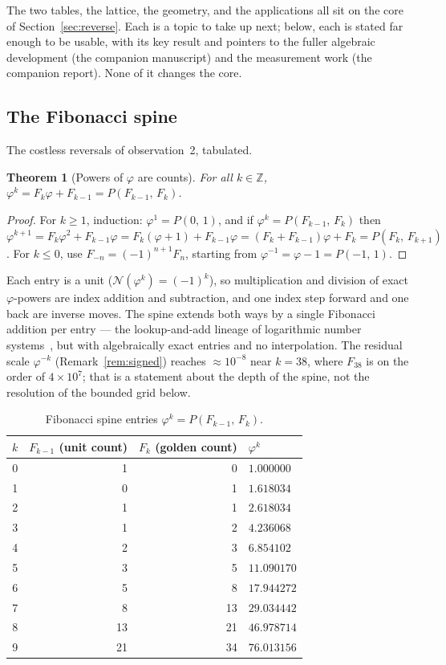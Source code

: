 \documentclass[11pt]{article}
\newtheorem{theorem}{Theorem}[section]
\theoremstyle{definition}
\theoremstyle{remark}
\newcommand{\Z}{\mathbb{Z}}
\newcommand{\Pb}[2]{P(#1,\,#2)}
\newcommand{\Norm}{\mathcal{N}}
\begin{document}
The two tables, the lattice, the geometry, and the applications all sit on the
core of Section~\ref{sec:reverse}. Each is a topic to take up next; below, each
is stated far enough to be usable, with its key result and pointers to the fuller
algebraic development (the companion manuscript) and the measurement work (the
companion report). None of it changes the core.

\subsection{The Fibonacci spine}
\label{ss:spine}

The costless reversals of observation~2, tabulated.

\begin{theorem}[Powers of $\varphi$ are counts]
\label{thm:fibpow}
For all $k\in\Z$, $\varphi^k=F_k\varphi+F_{k-1}=\Pb{F_{k-1}}{F_k}$.
\end{theorem}
\begin{proof}
For $k\ge1$, induction: $\varphi^1=\Pb{0}{1}$, and if
$\varphi^k=\Pb{F_{k-1}}{F_k}$ then $\varphi^{k+1}=F_k\varphi^2+F_{k-1}\varphi
=F_k(\varphi+1)+F_{k-1}\varphi=(F_k+F_{k-1})\varphi+F_k=\Pb{F_k}{F_{k+1}}$.
For $k\le0$, use $F_{-n}=(-1)^{n+1}F_n$, starting from
$\varphi^{-1}=\varphi-1=\Pb{-1}{1}$.
\end{proof}

Each entry is a unit ($\Norm(\varphi^k)=(-1)^k$), so multiplication and division
of exact $\varphi$-powers are index addition and subtraction, and one index step
forward and one back are inverse moves. The spine extends both ways by a single
Fibonacci addition per entry --- the lookup-and-add lineage of logarithmic
number systems~\cite{kingsbury,swartzlander}, but with algebraically exact
entries and no interpolation. The residual scale $\varphi^{-k}$
(Remark~\ref{rem:signed}) reaches $\approx10^{-8}$ near $k=38$, where $F_{38}$ is
on the order of $4\times10^7$; that is a statement about the depth of the spine,
not the resolution of the bounded grid below.

\begin{table}[h]
\centering
\caption{Fibonacci spine entries $\varphi^k=\Pb{F_{k-1}}{F_k}$.}
\label{tab:spine}
\begin{tabular}{rrrl}
\toprule
$k$ & $F_{k-1}$ (unit count) & $F_k$ (golden count) & $\varphi^k$ \\
\midrule
0 & 1 & 0 & $1.000000$ \\
1 & 0 & 1 & $1.618034$ \\
2 & 1 & 1 & $2.618034$ \\
3 & 1 & 2 & $4.236068$ \\
4 & 2 & 3 & $6.854102$ \\
5 & 3 & 5 & $11.090170$ \\
6 & 5 & 8 & $17.944272$ \\
7 & 8 & 13 & $29.034442$ \\
8 & 13 & 21 & $46.978714$ \\
9 & 21 & 34 & $76.013156$ \\
\bottomrule
\end{tabular}
\end{table}
\end{document}
